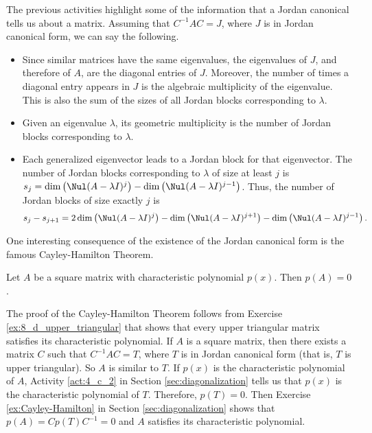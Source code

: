 The previous activities highlight some of the information that a Jordan canonical tells us about a matrix. Assuming that $C^{-1}AC = J$, where $J$ is in Jordan canonical form, we can say the following.
\begin{itemize}
\item Since similar matrices have the same eigenvalues, the eigenvalues of $J$, and therefore of $A$, are the diagonal entries of $J$. Moreover, the number of times a diagonal entry appears in $J$ is the algebraic multiplicity of the eigenvalue. This is also the sum of the sizes of all Jordan blocks corresponding to $\lambda$. 
\item Given an eigenvalue $\lambda$, its geometric multiplicity is the  number of Jordan blocks corresponding to $\lambda$.
\item Each generalized eigenvector leads to a Jordan block for that eigenvector. The number of Jordan blocks corresponding to $\lambda$ of size at least $j$ is $s_j = \dim\left(\Nul (A - \lambda I)^j\right) - \dim\left(\Nul (A -  \lambda I)^{j-1}\right)$. Thus, the number of Jordan blocks of size exactly $j$ is
\[s_j-s_{j+1} = 2 \dim\left(\Nul (A - \lambda I )^j\right) - \dim\left(\Nul (A - \lambda I )^{j+1}\right)  - \dim\left(\Nul (A - \lambda I)^{j-1}\right).\]
\end{itemize}	

One interesting consequence of the existence of the Jordan canonical form is the famous Cayley-Hamilton Theorem.

\begin{cor} Let $A$ be a square matrix with characteristic polynomial $p(x)$. Then $p(A) = 0$. 
\end{cor}

The proof of the Cayley-Hamilton Theorem follows from Exercise \ref{ex:8_d_upper_triangular} that shows that every upper triangular matrix satisfies its characteristic polynomial. If $A$ is a square matrix, then there exists a matrix $C$ such that $C^{-1}AC = T$, where $T$ is in Jordan canonical form (that is, $T$ is upper triangular). So $A$ is similar to $T$.  If $p(x)$ is the characteristic polynomial of $A$, Activity \ref{act:4_c_2} in Section \ref{sec:diagonalization} tells us that $p(x)$ is the characteristic polynomial of $T$. Therefore, $p(T) = 0$. Then Exercise \ref{ex:Cayley-Hamilton} in Section \ref{sec:diagonalization} shows that $p(A) = Cp(T)C^{-1} = 0$ and $A$ satisfies its characteristic polynomial. 



